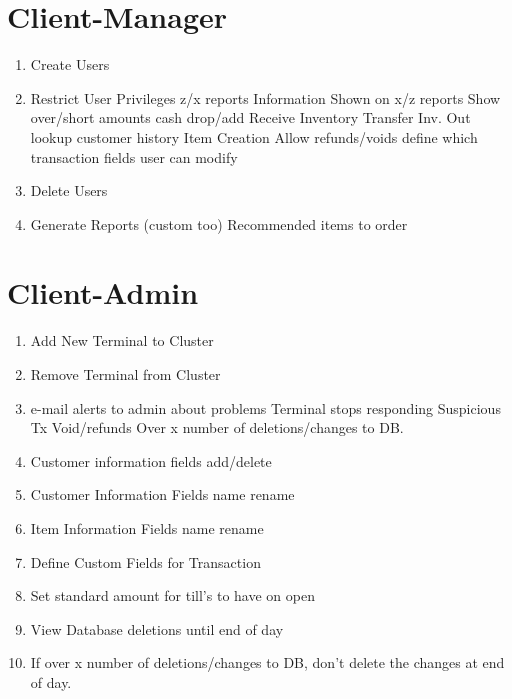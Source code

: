 \section{Client-Manager}
\begin{enumerate}
	\item Create Users
	\item Restrict User Privileges
		\subitem z/x reports
			\subsubitem Information Shown on x/z reports
			\subsubitem Show over/short amounts
		\subitem cash drop/add
		\subitem Receive Inventory
		\subitem Transfer Inv. Out
		\subitem lookup customer history
		\subitem Item Creation
		\subitem Allow refunds/voids
		\subitem define which transaction fields user can modify
	\item Delete Users
	\item Generate Reports (custom too)
		\subitem Recommended items to order
	
\end{enumerate}

\section{Client-Admin}
\begin{enumerate}
	\item Add New Terminal to Cluster
	\item Remove Terminal from Cluster
	\item e-mail alerts to admin about problems
		\subitem Terminal stops responding
		\subitem Suspicious Tx Void/refunds
		\subitem Over x number of deletions/changes to DB.
	\item Customer information fields add/delete
	\item Customer Information Fields name rename
	\item Item Information Fields name rename
	\item Define Custom Fields for Transaction
	\item Set standard amount for till's to have on open
	\item View Database deletions until end of day
	\item If over x number of deletions/changes to DB, don't delete the changes at end of day.
\end{enumerate}

